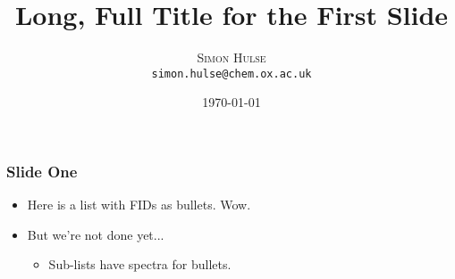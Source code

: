 \documentclass{mf_slides}
\title[Short Title]{Long, Full Title for the First Slide}
\author{\textsc{Simon Hulse} \\ \texttt{simon.hulse@chem.ox.ac.uk}}
\date[\shortdate]{\today}
\begin{document}
\begin{frame}[plain]
  \titlepage
\end{frame}

\begin{frame}
  \frametitle{Slide One}
  \begin{itemize}
      \item Here is a list with FIDs as bullets. Wow.
      \item But we're not done yet...
      \begin{itemize}
          \item Sub-lists have spectra for bullets.
      \end{itemize}
  \end{itemize}
\end{frame}
\end{document}
